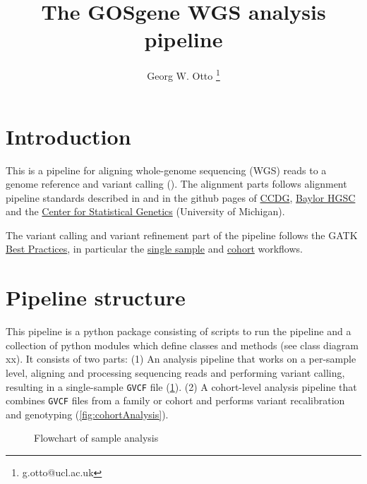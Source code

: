\documentclass[a4paper]{article}
\title{The GOSgene WGS analysis pipeline}
\author{Georg W. Otto \thanks{g.otto@ucl.ac.uk}}
\affil{The UCL Institute of Child Health}
\begin{document}
\maketitle

\tableofcontents

\section{Introduction}
\label{sec:introduction}

This is a pipeline for aligning whole-genome sequencing (WGS) reads to
a genome reference and variant calling
(). The
alignment parts follows alignment pipeline standards described in
\citep{Regier2018Functionalequivalenceof} and in the github pages of
\href{https://github.com/CCDG/Pipeline-Standardization/blob/master/PipelineStandard.md}{CCDG},
\href{https://github.com/HGSC-NGSI/HgV_Protocol_Descriptions/blob/master/hgv_ccdg_resequencing.md}{Baylor
  HGSC} and the
\href{https://github.com/statgen/docker-alignment}{Center for
  Statistical Genetics} (University of Michigan).

The variant calling and variant refinement part of the pipeline
follows the GATK
\href{https://software.broadinstitute.org/gatk/best-practices/workflow?id=11145}{Best
  Practices}, in particular the
\href{https://github.com/gatk-workflows/broad-prod-wgs-germline-snps-indels/blob/master/PairedEndSingleSampleWf.wdl}{single
  sample} and
\href{https://github.com/gatk-workflows/broad-prod-wgs-germline-snps-indels/blob/master/JointGenotypingWf.wdl}{cohort} workflows.


\section{Pipeline structure}
\label{sec:pipeline-structure}

This pipeline is a python package consisting of scripts to run the
pipeline and a collection of python modules which define classes and
methods (see class diagram xx). It consists of two parts: (1) An
analysis pipeline that works on a per-sample level, aligning and
processing sequencing reads and performing variant calling, resulting
in a single-sample \texttt{GVCF} file
(\cref{fig:sampleAnalysis}). (2) A cohort-level analysis pipeline that
combines \texttt{GVCF} files from a family or cohort and performs
variant recalibration and genotyping (\cref{fig:cohortAnalysis}).


\begin{figure}
  \begin{center}
    
    \caption[sanple analysis]{Flowchart of sample analysis}
  \label{fig:sampleAnalysis}
\end{center}
\end{figure}
\end{document}
